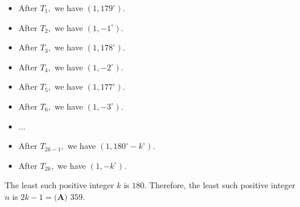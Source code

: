 \begin{enumerate}
 
            \begin{itemize}
        \item After $T_1,$ we have $(1,179^{\circ}).$
            \end{itemize}
            
            \begin{itemize}
        \item After $T_2,$ we have $(1,-1^{\circ}).$
            \end{itemize}
            
            \begin{itemize}
        \item After $T_3,$ we have $(1,178^{\circ}).$
            \end{itemize}
            
            \begin{itemize}
        \item After $T_4,$ we have $(1,-2^{\circ}).$
            \end{itemize}
            
            \begin{itemize}
        \item After $T_5,$ we have $(1,177^{\circ}).$
            \end{itemize}
            
            \begin{itemize}
        \item After $T_6,$ we have $(1,-3^{\circ}).$
            \end{itemize}
            
            \begin{itemize}
        \item ...
            \end{itemize}
            
            \begin{itemize}
        \item After $T_{2k-1},$ we have $(1,180^{\circ}-k^{\circ}).$
            \end{itemize}
            
            \begin{itemize}
        \item After $T_{2k},$ we have $(1,-k^{\circ}).$
            \end{itemize}
            The least such positive integer $k$ is $180.$ Therefore, the least such positive integer $n$ is $2k-1=\boxed{\textbf{(A) } 359}.$





\end{enumerate}

